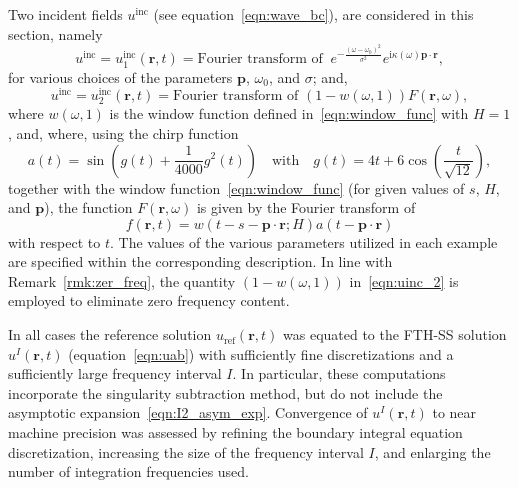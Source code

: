 \documentclass[11pt]{article}
\theoremstyle{plain}
\theoremstyle{remark}
\def \br{\mathbf{r}}
\def \bp{\mathbf{p}}
\begin{document}
Two incident fields $u^{\mathrm{inc}}$ (see
equation~\eqref{eqn:wave_bc}), are considered in this section, namely
\begin{equation}\label{eqn:gaussian_incidence}
  u^{\mathrm{inc}} = u^{\mathrm{inc}}_1(\br,t) = \text{Fourier transform of } \ e^{-\frac{(\omega - \omega_0)^2}{\sigma^2}}e^{\mathrm{i}\kappa(\omega) \bp \cdot \br},
\end{equation}
for various choices of the parameters $\bp$, $\omega_0$, and $\sigma$; and,
\begin{equation}\label{eqn:uinc_2}
u^{\mathrm{inc}} = u^{\mathrm{inc}}_2(\br,t) = \text{Fourier transform of } (1 - w(\omega, 1)) F(\br,\omega),
\end{equation}
where $w(\omega,1)$ is the window function defined
in~\eqref{eqn:window_func} with $H=1$, and, where, using the chirp
function
\begin{equation}\label{eqn:chirp_incidence}
  a(t) = \sin\left(g(t) + \frac{1}{4000}g^2(t)\right) \quad \text{with} \quad g(t) = 4t + 6\cos\left(\frac{t}{\sqrt{12}}\right),
\end{equation}
together with the window function~\eqref{eqn:window_func} (for given
values of $s$, $H$, and $\bp$), the
function $F(\br,\omega)$ is given by the Fourier transform of
\begin{equation}\label{eqn:td_chirp}
  f(\br,t) = w(t - s - \bp \cdot \br; H) a(t - \bp \cdot \br)
\end{equation}
with respect to $t$. The values of the various parameters utilized in
each example are specified within the corresponding description. In
line with Remark~\ref{rmk:zer_freq}, the quantity $(1 - w(\omega,1))$
in~\eqref{eqn:uinc_2} is employed to eliminate zero frequency content.

In all cases the reference solution $u_\mathrm{ref}(\br,t)$ was
equated to the FTH-SS solution $u^I(\br,t)$ (equation~\eqref{eqn:uab})
with sufficiently fine discretizations and a sufficiently large
frequency interval $I$. In particular, these computations incorporate
the singularity subtraction method, but do not include the asymptotic
expansion~\eqref{eqn:I2_asym_exp}. Convergence of $u^I(\br,t)$ to
near machine precision was assessed by refining the boundary integral
equation discretization, increasing the size of the frequency interval
$I$, and enlarging the number of integration frequencies used.
\end{document}
